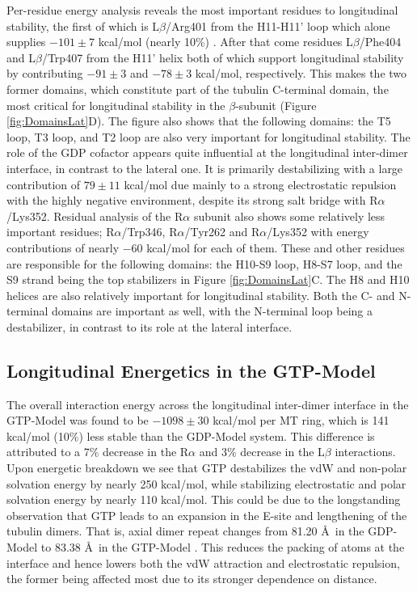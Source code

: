 \documentclass[11pt]{report}
\begin{document}
Per-residue energy analysis reveals the most important residues
to longitudinal stability, the first of which
is L$\beta$/Arg401 from the H11-H11' loop
which alone supplies $-101\pm7$ kcal/mol (nearly
10\%) \cite{Ayoub2014}. After that come residues L$\beta$/Phe404
and L$\beta$/Trp407 from the H11' helix
both of which support
longitudinal stability by contributing $-91\pm3$ and
$-78\pm3$ kcal/mol, respectively. This makes the two
former domains,
which constitute part of the tubulin C-terminal domain, the most critical for 
longitudinal stability in the $\beta$-subunit
(Figure \ref{fig:DomainsLat}D). The figure also shows that 
the following domains: the T5 loop, T3
loop, and T2 loop are also very important for longitudinal
stability. The role of the GDP cofactor appears quite
influential at the longitudinal inter-dimer interface, in contrast to the
lateral one. It is primarily destabilizing 
with a large contribution of $79\pm11$ kcal/mol
due mainly to a strong electrostatic repulsion with the 
highly negative environment, despite its strong salt bridge
with R$\alpha$/Lys352. Residual analysis of the R$\alpha$
subunit also shows some relatively less important
residues; R$\alpha$/Trp346, R$\alpha$/Tyr262 and R$\alpha$/Lys352
with energy contributions of nearly $-60$ kcal/mol for each of them.
These and other
residues are responsible for the following domains: the 
H10-S9 loop,
H8-S7 loop, and the
S9 strand being the top stabilizers in Figure \ref{fig:DomainsLat}C.
The H8 and H10 helices are also relatively 
important for longitudinal stability. Both the
C- and N-terminal domains are important as well,
with the N-terminal loop being a destabilizer,
in contrast to its role at the lateral interface.

\subsection{Longitudinal Energetics in the GTP-Model}
The overall interaction energy across the longitudinal inter-dimer
interface in the GTP-Model was found to be $-1098\pm30$
kcal/mol per MT ring, which is 141 kcal/mol (10\%)
less stable than the
GDP-Model system. This difference is attributed to 
a 7\% decrease in the R$\alpha$ and 3\% decrease in the L$\beta$ interactions.
Upon energetic breakdown we see that GTP destabilizes the
vdW and non-polar solvation energy by nearly 250 kcal/mol,
while stabilizing electrostatic and polar solvation energy by
nearly 110 kcal/mol. This could
be due to the longstanding
observation that GTP
leads to an expansion in the E-site
and lengthening of the tubulin dimers. That is, axial dimer repeat changes
from 81.20 \AA\ in the GDP-Model to
83.38 \AA\ in the GTP-Model
\cite{Hyman1995,Alushin2014}.
This reduces the packing of atoms 
at the interface and hence lowers
both the vdW attraction and electrostatic repulsion, the
former being affected most due
to its stronger dependence on 
distance.
\end{document}
